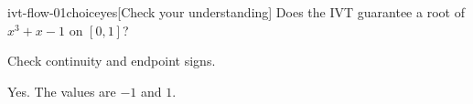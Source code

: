 \begin{bgcheck}{ivt-flow-01}{choice}{yes}[Check your understanding]
Does the IVT guarantee a root of \(x^3+x-1\) on \([0,1]\)?
\begin{bghint}
Check continuity and endpoint signs.
\end{bghint}
\begin{bgreveal}
Yes. The values are \(-1\) and \(1\).
\end{bgreveal}
\end{bgcheck}
